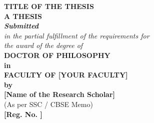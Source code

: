 \begin{titlepage}
\thispagestyle{empty}
\begin{center}


\vspace*{1.5cm}

{\fontsize{16}{20}\selectfont\textbf{TITLE OF THE THESIS}}\\[1.5\baselineskip]

{\fontsize{14}{18}\selectfont\textbf{A THESIS}}\\[0.5\baselineskip]
{\fontsize{14}{18}\selectfont\textit{\textbf{Submitted}}}\\[0.5\baselineskip]
{\fontsize{14}{18}\selectfont\textit{in the partial fulfillment of the requirements for}}\\[0.3\baselineskip]
{\fontsize{14}{18}\selectfont\textit{the award of the degree of}}\\[1.5\baselineskip]

{\fontsize{16}{20}\selectfont\textbf{DOCTOR OF PHILOSOPHY}}\\[0.5\baselineskip]
{\fontsize{14}{18}\selectfont\textbf{in}}\\[0.5\baselineskip]

{\fontsize{16}{20}\selectfont\textbf{FACULTY OF [YOUR FACULTY]}}\\[0.8\baselineskip]
{\fontsize{14}{18}\selectfont\textbf{by}}\\[0.8\baselineskip]

{\fontsize{16}{20}\selectfont\textbf{[Name of the Research Scholar]}}\\[0.3\baselineskip]
{\fontsize{12}{16}\selectfont(As per SSC / CBSE Memo)}\\[0.5\baselineskip]
{\fontsize{16}{20}\selectfont\textbf{[Reg. No. \hspace{4cm}]}}\\[1.5\baselineskip]


\end{center}
\end{titlepage}
